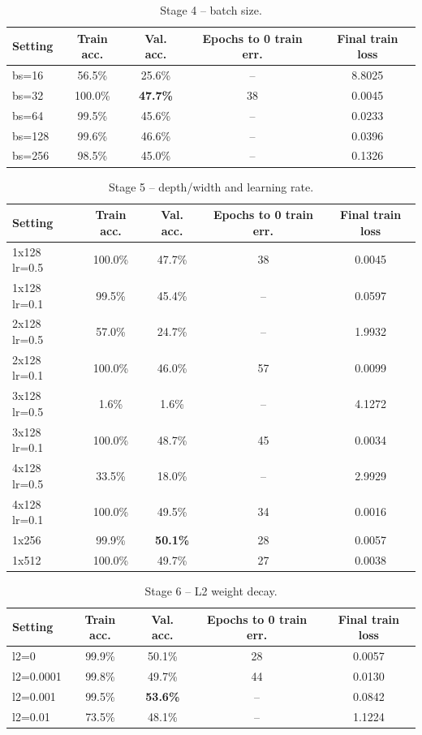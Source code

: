 \documentclass[12pt,a4paper]{article}
\begin{document}
\begin{table}[H]\centering\small
\begin{tabular}{lcccc}\toprule
Setting & Train acc. & Val. acc. & Epochs to 0 train err. & Final train loss \\\midrule
bs=16 & 56.5\% & 25.6\% & -- & 8.8025 \\
bs=32 & 100.0\% & \textbf{47.7\%} & 38 & 0.0045 \\
bs=64 & 99.5\% & 45.6\% & -- & 0.0233 \\
bs=128 & 99.6\% & 46.6\% & -- & 0.0396 \\
bs=256 & 98.5\% & 45.0\% & -- & 0.1326 \\
\bottomrule\end{tabular}
\caption{Stage 4 -- batch size.}\label{tab:batch}\end{table}
\begin{table}[H]\centering\small
\begin{tabular}{lcccc}\toprule
Setting & Train acc. & Val. acc. & Epochs to 0 train err. & Final train loss \\\midrule
1x128 lr=0.5 & 100.0\% & 47.7\% & 38 & 0.0045 \\
1x128 lr=0.1 & 99.5\% & 45.4\% & -- & 0.0597 \\
2x128 lr=0.5 & 57.0\% & 24.7\% & -- & 1.9932 \\
2x128 lr=0.1 & 100.0\% & 46.0\% & 57 & 0.0099 \\
3x128 lr=0.5 & 1.6\% & 1.6\% & -- & 4.1272 \\
3x128 lr=0.1 & 100.0\% & 48.7\% & 45 & 0.0034 \\
4x128 lr=0.5 & 33.5\% & 18.0\% & -- & 2.9929 \\
4x128 lr=0.1 & 100.0\% & 49.5\% & 34 & 0.0016 \\
1x256 & 99.9\% & \textbf{50.1\%} & 28 & 0.0057 \\
1x512 & 100.0\% & 49.7\% & 27 & 0.0038 \\
\bottomrule\end{tabular}
\caption{Stage 5 -- depth/width and learning rate.}\label{tab:depth}\end{table}
\begin{table}[H]\centering\small
\begin{tabular}{lcccc}\toprule
Setting & Train acc. & Val. acc. & Epochs to 0 train err. & Final train loss \\\midrule
l2=0 & 99.9\% & 50.1\% & 28 & 0.0057 \\
l2=0.0001 & 99.8\% & 49.7\% & 44 & 0.0130 \\
l2=0.001 & 99.5\% & \textbf{53.6\%} & -- & 0.0842 \\
l2=0.01 & 73.5\% & 48.1\% & -- & 1.1224 \\
\bottomrule\end{tabular}
\caption{Stage 6 -- L2 weight decay.}\label{tab:l2}\end{table}
\end{document}
